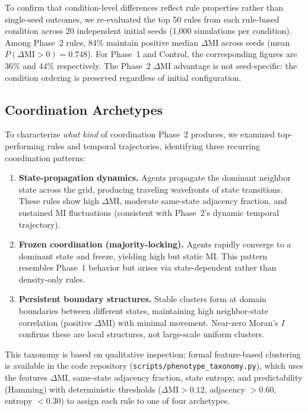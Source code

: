 \documentclass[letterpaper]{article}
\begin{document}
To confirm that condition-level differences reflect rule properties rather than
single-seed outcomes, we re-evaluated the top 50 rules from each rule-based
condition across 20 independent initial seeds (1{,}000 simulations per condition).
Among Phase~2 rules, 84\% maintain positive median $\Delta\mathrm{MI}$ across
seeds (mean $P(\Delta\mathrm{MI}>0) = 0.748$).
For Phase~1 and Control, the corresponding figures are 36\% and 44\%
respectively.  The Phase~2 $\Delta\mathrm{MI}$ advantage is not seed-specific:
the condition ordering is preserved regardless of initial configuration.

\subsection{Coordination Archetypes}
\label{sec:archetypes}

To characterize \emph{what kind} of coordination Phase~2 produces, we examined
top-performing rules and temporal trajectories, identifying three recurring
coordination patterns:

\begin{enumerate}
  \item \textbf{State-propagation dynamics.}  Agents propagate the dominant
        neighbor state across the grid, producing traveling wavefronts of state
        transitions.  These rules show high $\Delta\mathrm{MI}$, moderate
        same-state adjacency fraction, and sustained MI fluctuations
        (consistent with Phase~2's dynamic temporal trajectory).
  \item \textbf{Frozen coordination (majority-locking).}  Agents rapidly
        converge to a dominant state and freeze, yielding high but static MI.
        This pattern resembles Phase~1 behavior but arises via state-dependent
        rather than density-only rules.
  \item \textbf{Persistent boundary structures.}  Stable clusters form at
        domain boundaries between different states, maintaining high
        neighbor-state correlation (positive $\Delta\mathrm{MI}$) with minimal
        movement.  Near-zero Moran's $I$ confirms these are local structures,
        not large-scale uniform clusters.
\end{enumerate}

This taxonomy is based on qualitative inspection; formal feature-based
clustering is available in the code repository
(\texttt{scripts/phenotype\_taxonomy.py}), which uses the features
$\Delta\mathrm{MI}$, same-state adjacency fraction, state entropy,
and predictability (Hamming) with deterministic thresholds
($\Delta\mathrm{MI}>0.12$, adjacency $>0.60$, entropy $<0.30$)
to assign each rule to one of four archetypes.
\end{document}

